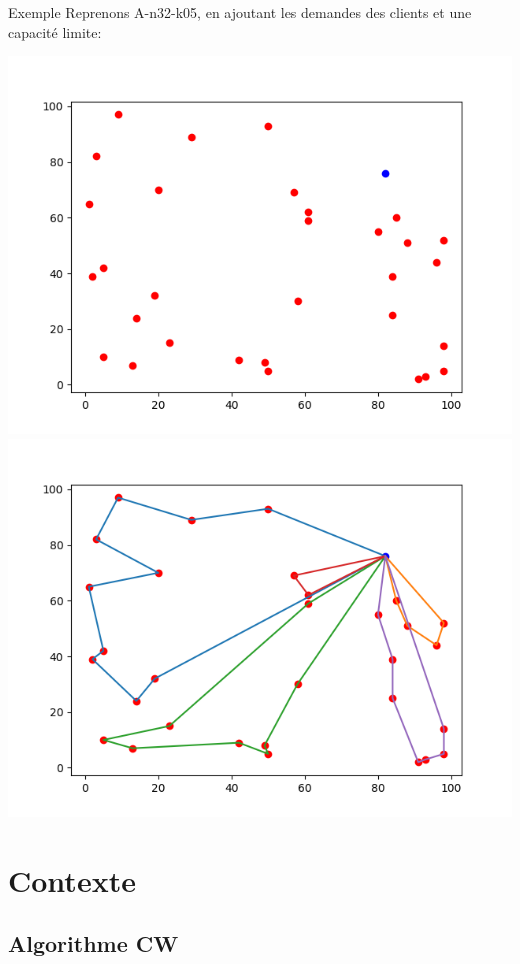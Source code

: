 \documentclass{beamer}
\begin{document}
\begin{frame}{Exemple}
Reprenons A-n32-k05, en ajoutant les demandes des clients et une capacité limite:
\begin{center}
\includegraphics[scale=0.32]{Instance.png}
\includegraphics[scale=0.32]{solutionCapacity.png}
\end{center}
\end{frame}

\section{Contexte}

\subsection{Algorithme CW}
\end{document}
